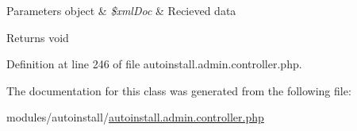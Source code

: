 \begin{DoxyParams}[1]{Parameters}
object & {\em \$xml\+Doc} & Recieved data \\
\hline
\end{DoxyParams}
\begin{DoxyReturn}{Returns}
void 
\end{DoxyReturn}


Definition at line 246 of file autoinstall.\+admin.\+controller.\+php.



The documentation for this class was generated from the following file\+:\begin{DoxyCompactItemize}
\item 
modules/autoinstall/\hyperlink{autoinstall_8admin_8controller_8php}{autoinstall.\+admin.\+controller.\+php}\end{DoxyCompactItemize}
